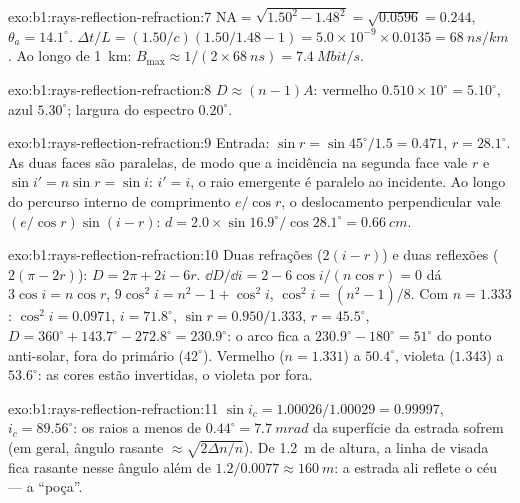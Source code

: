 \begin{solution}{exo:b1:rays-reflection-refraction:7}
$\mathrm{NA} = \sqrt{1.50^2 - 1.48^2} = \sqrt{0.0596} = 0.244$,
$\theta_a = 14.1^\circ$. $\Delta t/L = (1.50/c)(1.50/1.48 - 1) =
5.0\times10^{-9} \times 0.0135 = \qty{68}{ns/km}$. Ao longo de \qty{1}{km}:
$B_{\max} \approx 1/(2 \times \qty{68}{ns}) = \qty{7.4}{Mbit/s}$.
\end{solution}

\begin{solution}{exo:b1:rays-reflection-refraction:8}
$D \approx (n - 1)A$: vermelho $0.510 \times 10^\circ = 5.10^\circ$, azul
$5.30^\circ$; largura do espectro $0.20^\circ$.
\end{solution}

\begin{solution}{exo:b1:rays-reflection-refraction:9}
Entrada: $\sin r = \sin 45^\circ/1.5 = 0.471$, $r = 28.1^\circ$. As duas
faces são paralelas, de modo que a incidência na segunda face vale $r$ e
$\sin i' = n\sin r = \sin i$: $i' = i$, o raio emergente é paralelo ao
incidente. Ao longo do percurso interno de comprimento $e/\cos r$, o
deslocamento perpendicular vale $(e/\cos r)\sin(i - r)$:
$d = 2.0 \times \sin 16.9^\circ/\cos 28.1^\circ = \qty{0.66}{cm}$.
\end{solution}

\begin{solution}{exo:b1:rays-reflection-refraction:10}
Duas refrações ($2(i - r)$) e duas reflexões ($2(\pi - 2r)$):
$D = 2\pi + 2i - 6r$. $\dd D/\dd i = 2 - 6\cos i/(n\cos r) = 0$ dá
$3\cos i = n\cos r$, $9\cos^2 i = n^2 - 1 + \cos^2 i$, $\cos^2 i =
(n^2 - 1)/8$. Com $n = 1.333$: $\cos^2 i = 0.0971$, $i = 71.8^\circ$,
$\sin r = 0.950/1.333$, $r = 45.5^\circ$, $D = 360^\circ + 143.7^\circ -
272.8^\circ = 230.9^\circ$: o arco fica a $230.9^\circ - 180^\circ =
51^\circ$ do ponto anti-solar, fora do primário ($42^\circ$).
Vermelho ($n = 1.331$) a $50.4^\circ$, violeta ($1.343$) a $53.6^\circ$:
as cores estão invertidas, o violeta por fora.
\end{solution}

\begin{solution}{exo:b1:rays-reflection-refraction:11}
$\sin i_c = 1.00026/1.00029 = 0.99997$, $i_c = 89.56^\circ$: os raios
a menos de $0.44^\circ = \qty{7.7}{mrad}$ da superfície da estrada sofrem  (em geral, ângulo rasante $\approx \sqrt{2\Delta n/n}$). De
\qty{1.2}{m} de altura, a linha de visada fica rasante nesse ângulo além de
$1.2/0.0077 \approx \qty{160}{m}$: a estrada ali reflete o céu ---
a ``poça''.
\end{solution}

